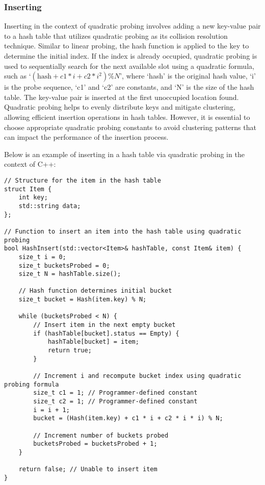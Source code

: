 \subsubsection{Inserting}

Inserting in the context of quadratic probing involves adding a new key-value pair to a hash table that utilizes quadratic probing as its collision resolution technique. Similar to linear probing, the 
hash function is applied to the key to determine the initial index. If the index is already occupied, quadratic probing is used to sequentially search for the next available slot using a quadratic formula, 
such as `$(\text{hash} + c1 * i + c2 * i^2) \% N$', where `hash' is the original hash value, `i' is the probe sequence, `c1' and `c2' are constants, and `N' is the size of the hash table. The key-value 
pair is inserted at the first unoccupied location found. Quadratic probing helps to evenly distribute keys and mitigate clustering, allowing efficient insertion operations in hash tables. However, it 
is essential to choose appropriate quadratic probing constants to avoid clustering patterns that can impact the performance of the insertion process.

\begin{solution}

Below is an example of inserting in a hash table via quadratic probing in the context of C++:

\horizontalline

\begin{verbatim}
// Structure for the item in the hash table
struct Item {
    int key;
    std::string data;
};

// Function to insert an item into the hash table using quadratic probing
bool HashInsert(std::vector<Item>& hashTable, const Item& item) {
    size_t i = 0;
    size_t bucketsProbed = 0;
    size_t N = hashTable.size();

    // Hash function determines initial bucket
    size_t bucket = Hash(item.key) % N;

    while (bucketsProbed < N) {
        // Insert item in the next empty bucket
        if (hashTable[bucket].status == Empty) {
            hashTable[bucket] = item;
            return true;
        }

        // Increment i and recompute bucket index using quadratic probing formula
        size_t c1 = 1; // Programmer-defined constant
        size_t c2 = 1; // Programmer-defined constant
        i = i + 1;
        bucket = (Hash(item.key) + c1 * i + c2 * i * i) % N;

        // Increment number of buckets probed
        bucketsProbed = bucketsProbed + 1;
    }

    return false; // Unable to insert item
}
\end{verbatim}

\horizontalline
    
\end{solution}

